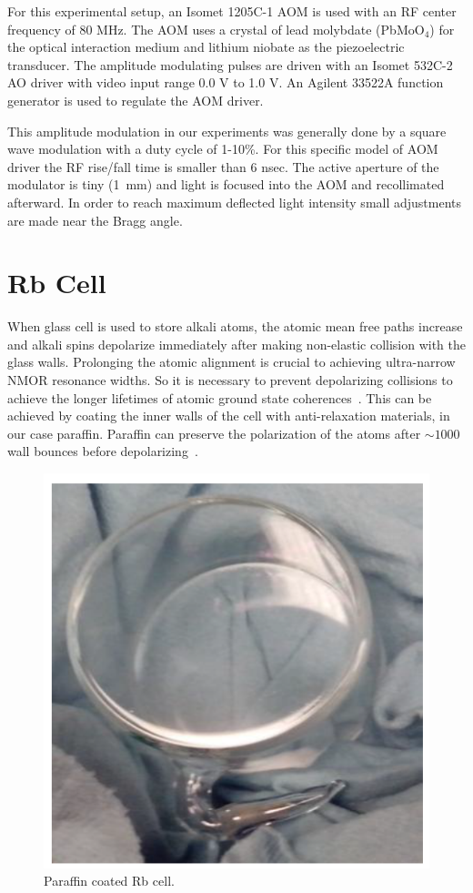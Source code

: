 For this experimental setup, an Isomet 1205C-1 AOM is used with an RF
center frequency of 80 MHz. The AOM uses a crystal of lead molybdate
(PbMoO$_4$) for the optical interaction medium and lithium niobate as
the piezoelectric transducer.  The amplitude modulating pulses are
driven with an Isomet 532C-2 AO driver with video input range 0.0 V to
1.0 V.  An Agilent 33522A function generator is used to regulate the
AOM driver.

This amplitude modulation in our experiments was generally done by a
square wave modulation with a duty cycle of 1-10\%. For this specific
model of AOM driver the RF rise/fall time is smaller than 6 nsec. The
active aperture of the modulator is tiny (1~mm) and light is focused
into the AOM and recollimated afterward.  In order to reach maximum
deflected light intensity small adjustments are made near the Bragg
angle.


\section{Rb Cell}

When glass cell is used to store alkali atoms, the atomic mean free
paths increase and alkali spins depolarize immediately after making
non-elastic collision with the glass walls. Prolonging the atomic
alignment is crucial to achieving ultra-narrow NMOR resonance
widths. So it is necessary to prevent depolarizing collisions to
achieve the longer lifetimes of atomic ground state
coherences~\cite{PhysRevA.72.023401,Balabas:10,doi:10.1063/1.3236649}.
This can be achieved by coating the inner walls of the cell with
anti-relaxation materials, in our case paraffin.  Paraffin can
preserve the polarization of the atoms after $\sim 1000$ wall bounces
before depolarizing~\cite{PhysRev.147.41,PhysRevA.72.023401}.

\begin{figure}%
\centering
\includegraphics[width=0.5\linewidth]{figures/cell}
\caption{Paraffin coated Rb cell.\label{fig:rb-cell}}
\end{figure}

